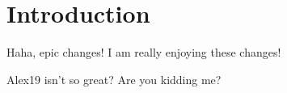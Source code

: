 \chapter{Introduction}
Haha, epic changes! I am really enjoying these changes!

Alex19 isn't so great? Are you kidding me?